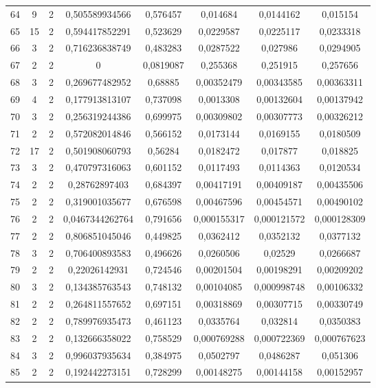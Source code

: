 \begin{longtable}{|c|c|c|c|c|c|c|c|}
64 & 9 & 2 & 0,505589934566 & 0,576457 & 0,014684 & 0,0144162 & 0,015154 \\
65 & 15 & 2 & 0,594417852291 & 0,523629 & 0,0229587 & 0,0225117 & 0,0233318 \\
66 & 3 & 2 & 0,716236838749 & 0,483283 & 0,0287522 & 0,027986 & 0,0294905 \\
67 & 2 & 2 & 0 & 0,0819087 & 0,255368 & 0,251915 & 0,257656 \\
68 & 3 & 2 & 0,269677482952 & 0,68885 & 0,00352479 & 0,00343585 & 0,00363311 \\
69 & 4 & 2 & 0,177913813107 & 0,737098 & 0,0013308 & 0,00132604 & 0,00137942 \\
70 & 3 & 2 & 0,256319244386 & 0,699975 & 0,00309802 & 0,00307773 & 0,00326212 \\
71 & 2 & 2 & 0,572082014846 & 0,566152 & 0,0173144 & 0,0169155 & 0,0180509 \\
72 & 17 & 2 & 0,501908060793 & 0,56284 & 0,0182472 & 0,017877 & 0,018825 \\
73 & 3 & 2 & 0,470797316063 & 0,601152 & 0,0117493 & 0,0114363 & 0,0120534 \\
74 & 2 & 2 & 0,28762897403 & 0,684397 & 0,00417191 & 0,00409187 & 0,00435506 \\
75 & 2 & 2 & 0,319001035677 & 0,676598 & 0,00467596 & 0,00454571 & 0,00490102 \\
76 & 2 & 2 & 0,0467344262764 & 0,791656 & 0,000155317 & 0,000121572 & 0,000128309 \\
77 & 2 & 2 & 0,806851045046 & 0,449825 & 0,0362412 & 0,0352132 & 0,0377132 \\
78 & 3 & 2 & 0,706400893583 & 0,496626 & 0,0260506 & 0,02529 & 0,0266687 \\
79 & 2 & 2 & 0,22026142931 & 0,724546 & 0,00201504 & 0,00198291 & 0,00209202 \\
80 & 3 & 2 & 0,134385763543 & 0,748132 & 0,00104085 & 0,000998748 & 0,00106332 \\
81 & 2 & 2 & 0,264811557652 & 0,697151 & 0,00318869 & 0,00307715 & 0,00330749 \\
82 & 2 & 2 & 0,789976935473 & 0,461123 & 0,0335764 & 0,032814 & 0,0350383 \\
83 & 2 & 2 & 0,132666358022 & 0,758529 & 0,000769288 & 0,000722369 & 0,000767623 \\
84 & 3 & 2 & 0,996037935634 & 0,384975 & 0,0502797 & 0,0486287 & 0,051306 \\
85 & 2 & 2 & 0,192442273151 & 0,728299 & 0,00148275 & 0,00144158 & 0,00152957 \\

\end{longtable}

